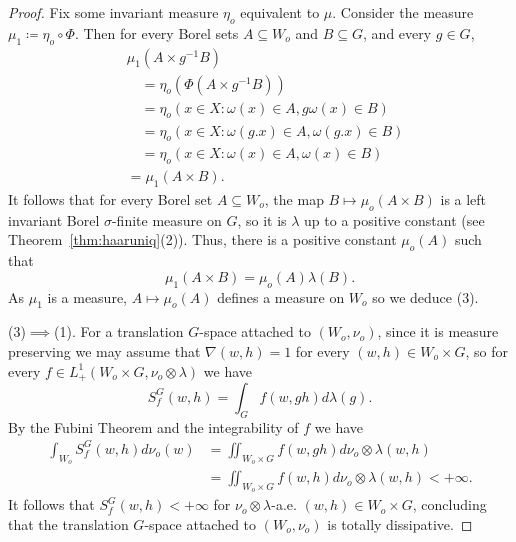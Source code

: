 \documentclass[10pt,a4paper]{amsart}
\begin{document}
\begin{proof}
Fix some invariant measure \(\eta_{o}\) equivalent to \(\mu\). Consider the measure \(\mu_{1}\coloneqq \eta_{o}\circ\Phi\). Then for every Borel sets \(A\subseteq W_{o}\) and \(B\subseteq G\), and every \(g\in G\),
\begin{align*}
&\mu_{1}\left(A\times g^{-1}B\right)\\
&\quad=\eta_{o}\left(\Phi\left(A\times g^{-1}B\right)\right)\\
&\quad=\eta_{o}\left(x\in X:\omega\left(x\right)\in A,g\omega\left(x\right)\in B\right)\\
&\quad=\eta_{o}\left(x\in X:\omega\left(g.x\right)\in A,\omega\left(g.x\right)\in B\right)\\
&\quad=\eta_{o}\left(x\in X:\omega\left(x\right)\in A,\omega\left(x\right)\in B\right)\\
&=\mu_{1}\left(A\times B\right).
\end{align*}
It follows that for every Borel set \(A\subseteq W_{o}\), the map \(B\mapsto\mu_{o}\left(A\times B\right)\) is a left invariant Borel \(\sigma\)-finite measure on \(G\), so it is \(\lambda\) up to a positive constant (see Theorem~\ref{thm:haaruniq}(2)). Thus, there is a positive constant \(\mu_{o}\left(A\right)\) such that
\[\mu_{1}\left(A\times B\right)=\mu_{o}\left(A\right)\lambda\left(B\right).\]
As \(\mu_{1}\) is a measure, \(A\mapsto\mu_{o}\left(A\right)\) defines a measure on \(W_{o}\) so we deduce (3).

(3)\(\implies\)(1). For a translation \(G\)-space attached to \(\left(W_{o},\nu_{o}\right)\), since it is measure preserving we may assume that \(\nabla\left(w,h\right)=1\) for every \(\left(w,h\right)\in W_{o}\times G\), so for every \(f\in L_{+}^{1}\left(W_{o}\times G,\nu_{o}\otimes\lambda\right)\) we have
\[S_{f}^{G}\left(w,h\right)=\int_{G}f\left(w,gh\right)d\lambda\left(g\right).\]
By the Fubini Theorem and the integrability of \(f\) we have
\begin{align*}
\int_{W_{o}}S_{f}^{G}\left(w,h\right)d\nu_{o}\left(w\right)	
&=\iint\nolimits_{W_{o}\times G}f\left(w,gh\right)d\nu_{o}\otimes\lambda\left(w,h\right)\\
&=\iint\nolimits_{W_{o}\times G}f\left(w,h\right)d\nu_{o}\otimes\lambda\left(w,h\right)<+\infty.
\end{align*}
It follows that \(S_{f}^{G}\left(w,h\right)<+\infty\) for \(\nu_{o}\otimes\lambda\)-a.e. \(\left(w,h\right)\in W_{o}\times G\), concluding that the translation \(G\)-space attached to \(\left(W_{o},\nu_{o}\right)\) is totally dissipative.
\end{proof}
\end{document}
